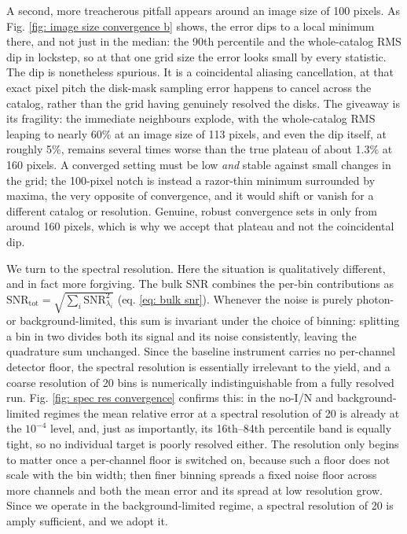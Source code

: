 \documentclass[12pt,a4paper]{article}
\numberwithin{equation}{section}
\numberwithin{figure}{section}
\numberwithin{table}{section}
\begin{document}
A second, more treacherous pitfall appears around an image size of 100 pixels. As Fig. \ref{fig: image size convergence b} shows, the error dips to a local minimum there, and not just in the median: the 90th percentile and the whole-catalog RMS dip in lockstep, so at that one grid size the error looks small by every statistic. The dip is nonetheless spurious. It is a coincidental aliasing cancellation, at that exact pixel pitch the disk-mask sampling error happens to cancel across the catalog, rather than the grid having genuinely resolved the disks. The giveaway is its fragility: the immediate neighbours explode, with the whole-catalog RMS leaping to nearly 60\% at an image size of 113 pixels, and even the dip itself, at roughly 5\%, remains several times worse than the true plateau of about 1.3\% at 160 pixels. A converged setting must be low \textit{and} stable against small changes in the grid; the 100-pixel notch is instead a razor-thin minimum surrounded by maxima, the very opposite of convergence, and it would shift or vanish for a different catalog or resolution. Genuine, robust convergence sets in only from around 160 pixels, which is why we accept that plateau and not the coincidental dip.

We turn to the spectral resolution. Here the situation is qualitatively different, and in fact more forgiving. The bulk SNR combines the per-bin contributions as $\text{SNR}_\text{tot} = \sqrt{\sum_i \text{SNR}_{\lambda_i}^2}$ (eq. \ref{eq: bulk snr}). Whenever the noise is purely photon- or background-limited, this sum is invariant under the choice of binning: splitting a bin in two divides both its signal and its noise consistently, leaving the quadrature sum unchanged. Since the baseline instrument carries no per-channel detector floor, the spectral resolution is essentially irrelevant to the yield, and a coarse resolution of 20 bins is numerically indistinguishable from a fully resolved run. Fig. \ref{fig: spec res convergence} confirms this: in the no-I/N and background-limited regimes the mean relative error at a spectral resolution of 20 is already at the $10^{-4}$ level, and, just as importantly, its 16th--84th percentile band is equally tight, so no individual target is poorly resolved either. The resolution only begins to matter once a per-channel floor is switched on, because such a floor does not scale with the bin width; then finer binning spreads a fixed noise floor across more channels and both the mean error and its spread at low resolution grow. Since we operate in the background-limited regime, a spectral resolution of 20 is amply sufficient, and we adopt it.
\end{document}
